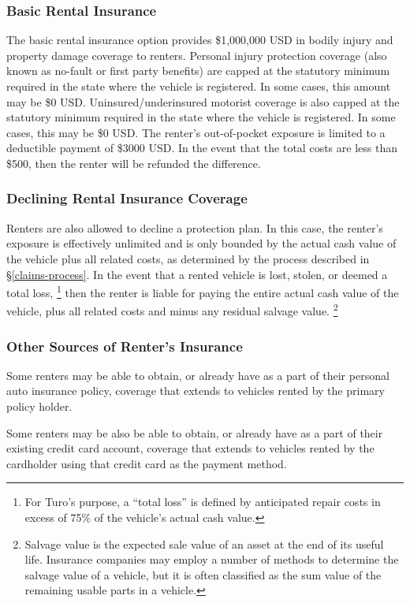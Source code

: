 \documentclass[preprint,12pt]{elsarticle}
\begin{document}
\subsubsection{Basic Rental Insurance}\label{basic-rental-insurance}
The basic rental insurance option provides \$1,000,000 USD in bodily injury and property damage coverage to renters. Personal injury protection coverage (also known as no-fault or first party benefits) are capped at the statutory minimum required in the state where the vehicle is registered. In some cases, this amount may be \$0 USD. Uninsured/underinsured motorist coverage is also capped at the statutory minimum required in the state where the vehicle is registered. In some cases, this may be \$0 USD. The renter's out-of-pocket exposure is limited to a deductible payment of \$3000 USD. In the event that the total costs are less than \$500, then the renter will be refunded the difference.

\subsubsection{Declining Rental Insurance Coverage}
Renters are also allowed to decline a protection plan. In this case, the renter's exposure is effectively unlimited and is only bounded by the actual cash value of the vehicle plus all related costs, as determined by the process described in \S\ref{claims-process}. In the event that a rented vehicle is lost, stolen, or deemed a total loss,
\footnote{For Turo's purpose, a ``total loss'' is defined by anticipated repair costs in excess of 75\% of the vehicle's actual cash value.
}
then the renter is liable for paying the entire actual cash value of the vehicle, plus all related costs and minus any residual salvage value.
\footnote{Salvage value is the expected sale value of an asset at the end of its useful life. Insurance companies may employ a number of methods to determine the salvage value of a vehicle, but it is often classified as the sum value of the remaining usable parts in a vehicle.
}

\subsubsection{Other Sources of Renter's Insurance}
Some renters may be able to obtain, or already have as a part of their personal auto insurance policy, coverage that extends to vehicles rented by the primary policy holder.

Some renters may be also be able to obtain, or already have as a part of their existing credit card account, coverage that extends to vehicles rented by the cardholder using that credit card as the payment method.
\end{document}
